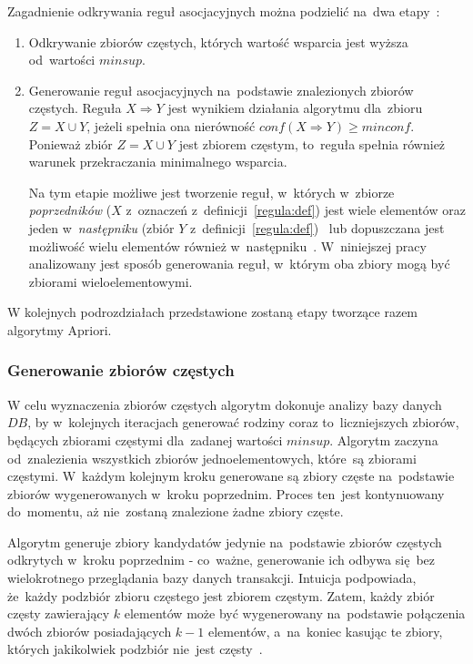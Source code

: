 Zagadnienie odkrywania reguł asocjacyjnych można podzielić na~dwa etapy~\cite{Problem:Statement}:
\begin{enumerate}
	\item Odkrywanie zbiorów częstych, których wartość wsparcia jest wyższa od~wartości $minsup$.
	\item Generowanie reguł asocjacyjnych na~podstawie znalezionych zbiorów częstych. Reguła $X \Rightarrow Y$ jest wynikiem działania algorytmu dla~zbioru $Z = X \cup Y$, jeżeli spełnia ona nierówność $conf(X \Rightarrow Y) \geq minconf$. Ponieważ zbiór $Z = X \cup Y$ jest zbiorem częstym, to~reguła spełnia również warunek przekraczania minimalnego wsparcia.

	Na tym etapie możliwe jest tworzenie reguł, w~których w~zbiorze \emph{poprzedników} ($X$ z~oznaczeń z~definicji~\ref{regula:def}) jest wiele elementów oraz jeden w~\emph{następniku} (zbiór $Y$ z~definicji~\ref{regula:def})~\cite{Problem:Statement} lub dopuszczana jest możliwość wielu elementów również w~następniku~\cite{Apriori:Main}. W~niniejszej pracy analizowany jest sposób generowania reguł, w~którym oba zbiory mogą być zbiorami wieloelementowymi.
\end{enumerate}

W kolejnych podrozdziałach przedstawione zostaną etapy tworzące razem algorytmy Apriori.

\subsubsection{Generowanie zbiorów częstych}\label{apriori:gen}
W celu wyznaczenia zbiorów częstych algorytm dokonuje analizy bazy danych $DB$, by w~kolejnych iteracjach generować rodziny coraz to~liczniejszych zbiorów, będących zbiorami częstymi dla~zadanej wartości $minsup$. Algorytm zaczyna od~znalezienia wszystkich zbiorów jednoelementowych, które~są zbiorami częstymi. W~każdym kolejnym kroku generowane są zbiory częste na~podstawie zbiorów wygenerowanych w~kroku poprzednim. Proces ten~jest kontynuowany do~momentu, aż nie~zostaną znalezione żadne zbiory częste.

Algorytm generuje zbiory kandydatów jedynie na~podstawie zbiorów częstych odkrytych w~kroku poprzednim - co~ważne, generowanie ich odbywa się~bez wielokrotnego przeglądania bazy danych transakcji. Intuicja podpowiada, że~każdy podzbiór zbioru częstego jest zbiorem częstym. Zatem, każdy zbiór częsty zawierający $k$ elementów może być wygenerowany na~podstawie połączenia dwóch zbiorów posiadających $k-1$ elementów, a~na~koniec kasując te zbiory, których jakikolwiek podzbiór nie~jest częsty~\cite{Apriori:Main}.

